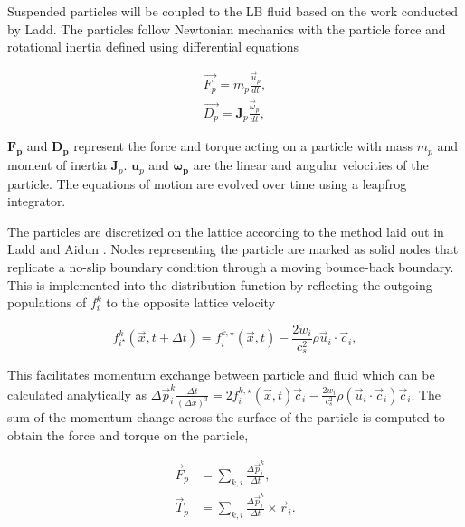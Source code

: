 Suspended particles will be coupled to the LB fluid based on the work conducted by Ladd. \cite{ladd_numerical_1994, 
aidun_direct_1998, ladd_lattice-boltzmann_2001} The particles follow Newtonian mechanics with the particle force and
rotational inertia defined using differential equations

\begin{equation}
    \begin{split}
    \vec{F_p} = m_p \frac{\vec{u}_p}{dt} , \\
    \vec{D_p} = \mathbf{J}_p \frac{\vec{\omega}_p}{dt} ,
    \label{eq:md}
    \end{split}
\end{equation}

$\mathbf{F_p}$ and $\mathbf{D_p}$ represent the force and torque acting on a particle with mass $m_p$ and moment of inertia 
$\mathbf{J}_p$. $\mathbf{u}_p$ and $\mathbf{\omega_{p}}$ are the linear and angular velocities of the particle. The equations of 
motion are evolved over time using a leapfrog integrator. \cite{jansen_bijels_2011}

The particles are discretized on the lattice according to the method laid out in Ladd and Aidun 
\cite{ladd_lattice-boltzmann_2001}. Nodes representing the particle are marked as solid nodes that replicate
a no-slip boundary condition through a moving bounce-back boundary. This is implemented into the distribution function
by reflecting the outgoing populations of $f_i^k$ to the opposite lattice velocity

\begin{equation}
    f^k_{i^\star}(\vec{x}, t+\Delta t) = f^{k,\star}_i(\vec{x}, t) - \frac{2w_i}{c_s^2} \rho \vec{u}_i \cdot \vec{c}_i ,
\end{equation}

This facilitates momentum exchange between particle and fluid which can be calculated analytically as 
\(\Delta\vec{p}^k_i \frac{\Delta t}{(\Delta x)^3} = 2 f^{k,\star}_i(\vec{x},t)\vec{c}_i - \frac{2w_i}{c_s^2}\rho(\vec{u}_i\cdot\vec{c}_i)\vec{c}_i\).
The sum of the momentum change across the surface of the particle is computed to obtain the force and torque on the particle,

\begin{equation}
    \begin{split}
    \vec{F}_p &= \sum_{k,i} \frac{\Delta \vec{p}^k_i}{\Delta t} , \\
    \vec{T}_p &= \sum_{k,i} \frac{\Delta\vec{p}^k_i}{\Delta t} \times \vec{r}_i .
    \end{split}
\end{equation}

